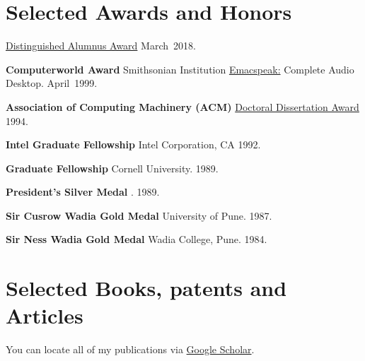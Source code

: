 \documentclass{article}
\begin{document}
\section*{Selected Awards and Honors}
\begin{compactitem}
\item \textbf{\iitb}
  \href{http://www.iitb.ac.in/alumni/en/awards/2018/distinguished-alumnus/dr-t-v-raman}{Distinguished Alumnus Award}
  \hfill March~2018.
\item \textbf{Computerworld Award} {Smithsonian Institution}
  \href{http://emacspeak.sf.net}{Emacspeak:} Complete Audio
  Desktop. \hfill April~1999.
\item \textbf{Association of Computing Machinery (ACM)}
  \href{http://awards.acm.org/award_winners/raman_4110221.cfm}{%
    Doctoral Dissertation Award} \hfill1994.
\item \textbf{Intel Graduate Fellowship} {Intel Corporation, CA}
  \hfill 1992.
\item \textbf{Graduate Fellowship} Cornell University.  \hfill
  1989.
\item \textbf{President's Silver Medal} {\iitb}.  \hfill 1989.
\item \textbf{Sir Cusrow Wadia Gold Medal} {University of Pune}.
  \hfill 1987.
\item \textbf{Sir Ness Wadia Gold Medal} {Wadia College, Pune}.  \hfill 1984.
\end{compactitem}

\section*{Selected Books, patents and Articles}

You can locate all of my publications via 
\href{http://scholar.google.com/citations?user=mVNjyD8AAAAJ}{Google Scholar}.
\end{document}
